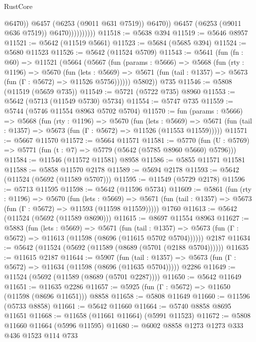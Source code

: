 \begin{lexlean}{RustCore}
\begin{coremodule}
                                @6470))
                            @6457
                            (@6253 (@9011 @631 @7519))
                            @6470))
                        @6457
                        (@6253 (@9011 @636 @7519))
                        @6470))))))))))
@11518 := @5638 @394
@11519 := @5646 @8957
@11521 := @5642 (@11519 @5661)
@11523 := @5684 (@5685 @394)
@11524 := @5680 @11523
@11526 := @5642 (@11524 @5709)
@11543 := @5641
    (fun (fn : @60) =>
    @11521
      (@5664
        (@5667
          (fun (params : @5666) =>
          @5668
            (fun (rty : @1196) =>
            @5670
              (fun (lets : @5669) =>
              @5671 (fun (tail : @1357) => @5673 (fun (Γ : @5672) => @11526 @5756))))))
        @5802))
    @735
@11546 := @5808 (@11519 (@5659 @735))
@11549 := @5721 (@5722 @735) @8960
@11553 := @5642 (@5713 (@11549 @5730) @5734)
@11554 := @5747 @735
@11559 := @5744 (@5746 @11554 @8963 @5702 @5704)
@11570 := fun (params : @5666) =>
  @5668
    (fun (rty : @1196) =>
    @5670
      (fun (lets : @5669) =>
      @5671 (fun (tail : @1357) => @5673 (fun (Γ : @5672) => @11526 (@11553 @11559)))))
@11571 := @5667 @11570
@11572 := @5664 @11571
@11581 := @5770 (fun (U : @5769) => @5771 (fun (t : @7) => @5779 (@5642 (@5785 @8960 @5660) @5796)))
@11584 := @11546 (@11572 @11581) @8958
@11586 := @5855 @11571 @11581
@11588 := @5858 @11570 @2178
@11589 := @5694 @2178
@11593 := @5642 (@11524 (@5692 (@11589 @5707)))
@11595 := @11549 (@5729 @2178)
@11596 := @5713 @11595
@11598 := @5642 (@11596 @5734)
@11609 := @5861
    (fun (rty : @1196) =>
    @5670
      (fun (lets : @5669) =>
      @5671 (fun (tail : @1357) => @5673 (fun (Γ : @5672) => @11593 (@11598 @11559)))))
    @1760
@11613 := @5642 (@11524 (@5692 (@11589 @8690)))
@11615 := @8697 @11554 @8963
@11627 := @5883
    (fun (lets : @5669) =>
    @5671
      (fun (tail : @1357) =>
      @5673 (fun (Γ : @5672) => @11613 (@11598 (@8696 (@11615 @5702 @5704))))))
    @2187
@11634 := @5642 (@11524 (@5692 (@11589 (@8689 (@5701 (@2188 @5704))))))
@11635 := @11615 @2187
@11644 := @5907
    (fun (tail : @1357) => @5673 (fun (Γ : @5672) => @11634 (@11598 (@8696 (@11635 @5704)))))
    @2286
@11649 := @11524 (@5692 (@11589 (@8689 (@5701 @2287))))
@11650 := @5642 @11649
@11651 := @11635 @2286
@11657 := @5925 (fun (Γ : @5672) => @11650 (@11598 (@8696 @11651))) @8858
@11658 := @5808 @11649
@11660 := @11596 (@5733 @8858)
@11661 := @5642 @11660
@11664 := @5740 @8858 @8695 @11651
@11668 := @11658 (@11661 @11664) (@5991 @11523)
@11672 := @5808 @11660 @11664 (@5996 @11595)
@11680 := @6002 @8858 @1273 @1273 @333 @436 @1523 @114 @733

\end{coremodule}
\end{lexlean}
